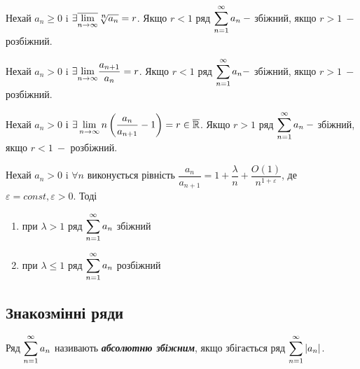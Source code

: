 \begin{theorem}
Нехай $a_n \geqslant  0$ i  $ \exists \overline{\Lim_{n \to \infty}}
 \sqrt[\leftroot{-1}\uproot{2}\scriptstyle n]{a_n} =r $. Якщо $r < 1 $ ряд $\displaystyle\sum\limits_{n=1}^\infty a_n \: - $ збіжний, якщо \newline $r > 1 \: - $ розбіжний.
\end{theorem}

\begin{theorem}
Нехай $a_n > 0$ i   $\exists {\displaystyle\lim\limits_{n \to \infty}} \dfrac{a_{n+1}}{a_n}=r $. Якщо $r < 1 $ ряд $\displaystyle\sum\limits_{n=1}^\infty a_n - $ збіжний, якщо \newline $r > 1 \: - $ розбіжний.
\end{theorem}

\begin{theorem}

Нехай $a_n > 0$ і $\exists \displaystyle\lim\limits_{n \to \infty} n\left(\dfrac{a_n}{a_{n+1}}-1\right)=r \in \mathbb{\overline{R}}$. Якщо $r > 1 $ ряд $\displaystyle\sum\limits_{n=1}^\infty a_n \: - $ збіжний, якщо $ r < 1 \: - $ розбіжний.
\end{theorem}

\begin{theorem}

Нехай $a_n > 0$ i $\forall n $ виконується рівність $\dfrac{a_n}{a_{n+1}}= 1 + \dfrac{\lambda}{n}+\dfrac{O(1)}{n^{1+\varepsilon}}$, де $\varepsilon = const,\varepsilon > 0$. Тоді
       \begin{enumerate}
           \item при $\lambda > 1 $ ряд  $\displaystyle\sum\limits_{n=1}^\infty a_n $ збіжний
           \item при $\lambda \leqslant  1 $ ряд  $\displaystyle\sum\limits_{n=1}^\infty a_n $ розбіжний
       \end{enumerate}
       
\end{theorem}

\subsection{\large{Знакозмінні ряди}}
\begin{definition}
  Ряд $\displaystyle\sum\limits_{n=1}^\infty a_n$ називають \textcolor{NavyBlue}{\textbf{\textit{абсолютню збіжним}}}, якщо збігається ряд  $\displaystyle\sum\limits_{n=1}^\infty |a_n|$.
\end{definition}

